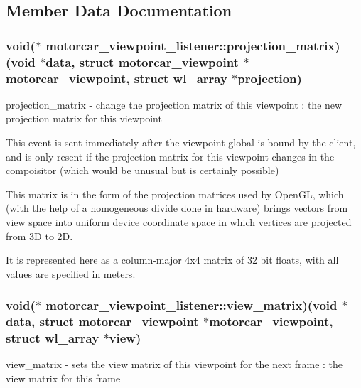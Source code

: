 \subsection{Member Data Documentation}
\hypertarget{structmotorcar__viewpoint__listener_ac3811e768cf181e5c3c4377fd11816d8}{
\subsubsection[{projection\-\_\-matrix}]{\setlength{\rightskip}{0pt plus 5cm}void($\ast$ motorcar\-\_\-viewpoint\-\_\-listener\-::projection\-\_\-matrix)(void $\ast$data, struct motorcar\-\_\-viewpoint $\ast$motorcar\-\_\-viewpoint, struct wl\-\_\-array $\ast$projection)}}\label{structmotorcar__viewpoint__listener_ac3811e768cf181e5c3c4377fd11816d8}
projection\-\_\-matrix -\/ change the projection matrix of this viewpoint \-: the new projection matrix for this viewpoint

This event is sent immediately after the viewpoint global is bound by the client, and is only resent if the projection matrix for this viewpoint changes in the compoisitor (which would be unusual but is certainly possible)

This matrix is in the form of the projection matrices used by Open\-G\-L, which (with the help of a homogeneous divide done in hardware) brings vectors from view space into uniform device coordinate space in which vertices are projected from 3\-D to 2\-D.

It is represented here as a column-\/major 4x4 matrix of 32 bit floats, with all values are specified in meters. \hypertarget{structmotorcar__viewpoint__listener_a62bcafc2fde2470d81ea8bce70855af5}{
\subsubsection[{view\-\_\-matrix}]{\setlength{\rightskip}{0pt plus 5cm}void($\ast$ motorcar\-\_\-viewpoint\-\_\-listener\-::view\-\_\-matrix)(void $\ast$data, struct motorcar\-\_\-viewpoint $\ast$motorcar\-\_\-viewpoint, struct wl\-\_\-array $\ast$view)}}\label{structmotorcar__viewpoint__listener_a62bcafc2fde2470d81ea8bce70855af5}
view\-\_\-matrix -\/ sets the view matrix of this viewpoint for the next frame \-: the view matrix for this frame

